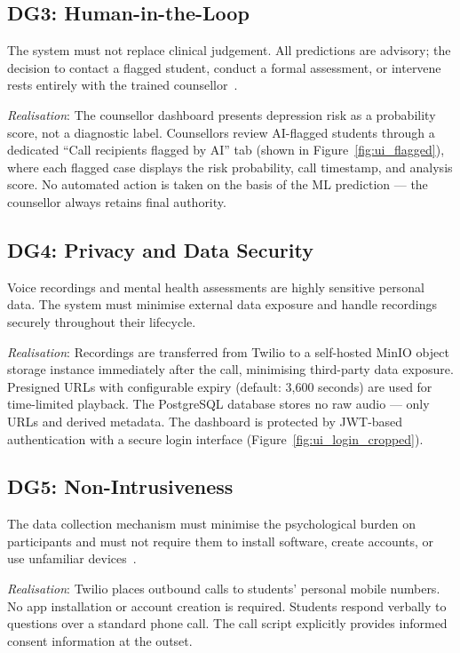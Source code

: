 \subsection{DG3: Human-in-the-Loop}

The system must not replace clinical judgement. All predictions are advisory; the decision to contact a flagged student, conduct a formal assessment, or intervene rests entirely with the trained counsellor~\cite{Thieme2020}.

\textit{Realisation}: The counsellor dashboard presents depression risk as a probability score, not a diagnostic label. Counsellors review AI-flagged students through a dedicated ``Call recipients flagged by AI'' tab (shown in Figure~\ref{fig:ui_flagged}), where each flagged case displays the risk probability, call timestamp, and analysis score. No automated action is taken on the basis of the ML prediction — the counsellor always retains final authority.

\subsection{DG4: Privacy and Data Security}

Voice recordings and mental health assessments are highly sensitive personal data. The system must minimise external data exposure and handle recordings securely throughout their lifecycle.

\textit{Realisation}: Recordings are transferred from Twilio to a self-hosted MinIO object storage instance immediately after the call, minimising third-party data exposure. Presigned URLs with configurable expiry (default: 3,600 seconds) are used for time-limited playback. The PostgreSQL database stores no raw audio — only URLs and derived metadata. The dashboard is protected by JWT-based authentication with a secure login interface (Figure~\ref{fig:ui_login_cropped}).

\subsection{DG5: Non-Intrusiveness}

The data collection mechanism must minimise the psychological burden on participants and must not require them to install software, create accounts, or use unfamiliar devices~\cite{Maharjan2022}.

\textit{Realisation}: Twilio places outbound calls to students' personal mobile numbers. No app installation or account creation is required. Students respond verbally to questions over a standard phone call. The call script explicitly provides informed consent information at the outset.

